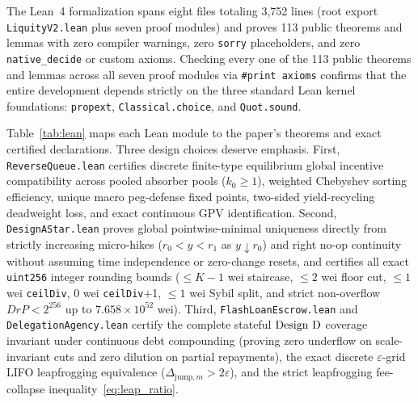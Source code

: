 The Lean~4 formalization spans eight files totaling 3,752 lines (root export \texttt{LiquityV2.lean} plus seven proof modules) and proves 113 public theorems and lemmas with zero compiler warnings, zero \texttt{sorry} placeholders, and zero \texttt{native\_decide} or custom axioms. Checking every one of the 113 public theorems and lemmas across all seven proof modules via \texttt{\#print axioms} confirms that the entire development depends strictly on the three standard Lean kernel foundations: \texttt{propext}, \texttt{Classical.choice}, and \texttt{Quot.sound}.

Table~\ref{tab:lean} maps each Lean module to the paper's theorems and exact certified declarations. Three design choices deserve emphasis. First, \texttt{ReverseQueue.lean} certifies discrete finite-type equilibrium global incentive compatibility across pooled absorber pools ($k_0 \ge 1$), weighted Chebyshev sorting efficiency, unique macro peg-defense fixed points, two-sided yield-recycling deadweight loss, and exact continuous GPV identification. Second, \texttt{DesignAStar.lean} proves global pointwise-minimal uniqueness directly from strictly increasing micro-hikes ($r_0 < y < r_1$ as $y \downarrow r_0$) and right no-op continuity without assuming time independence or zero-change resets, and certifies all exact \texttt{uint256} integer rounding bounds ($\le K - 1$ wei staircase, $\le 2$ wei floor cut, $\le 1$ wei \texttt{ceilDiv}, $0$ wei \texttt{ceilDiv}+1, $\le 1$ wei Sybil split, and strict non-overflow $D r P < 2^{256}$ up to $7.658 \times 10^{52}$ wei). Third, \texttt{FlashLoanEscrow.lean} and \texttt{DelegationAgency.lean} certify the complete stateful $\textup{Design D}$ coverage invariant under continuous debt compounding (proving zero underflow on scale-invariant cuts and zero dilution on partial repayments), the exact discrete $\varepsilon$-grid LIFO leapfrogging equivalence ($\Delta_{\mathrm{jump}, m} > 2\varepsilon$), and the strict leapfrogging fee-collapse inequality~\eqref{eq:leap_ratio}.

